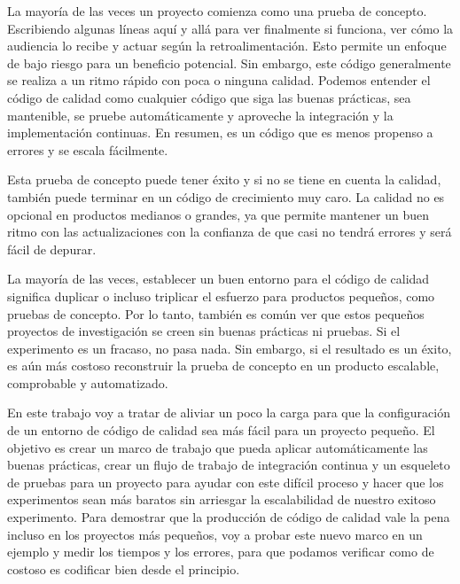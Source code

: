 La mayoría de las veces un proyecto comienza como una prueba de concepto. Escribiendo algunas líneas aquí y allá para ver finalmente si funciona, ver cómo la audiencia lo recibe y actuar según la retroalimentación. Esto permite un enfoque de bajo riesgo para un beneficio potencial. Sin embargo, este código generalmente se realiza a un ritmo rápido con poca o ninguna calidad. Podemos entender el código de calidad como cualquier código que siga las buenas prácticas, sea mantenible, se pruebe automáticamente y aproveche la integración y la implementación continuas. En resumen, es un código que es menos propenso a errores y se escala fácilmente.

Esta prueba de concepto puede tener éxito y si no se tiene en cuenta la calidad, también puede terminar en un código de crecimiento muy caro. La calidad no es opcional en productos medianos o grandes, ya que permite mantener un buen ritmo con las actualizaciones con la confianza de que casi no tendrá errores y será fácil de depurar.

La mayoría de las veces, establecer un buen entorno para el código de calidad significa duplicar o incluso triplicar el esfuerzo para productos pequeños, como pruebas de concepto. Por lo tanto, también es común ver que estos pequeños proyectos de investigación se creen sin buenas prácticas ni pruebas. Si el experimento es un fracaso, no pasa nada. Sin embargo, si el resultado es un éxito, es aún más costoso reconstruir la prueba de concepto en un producto escalable, comprobable y automatizado.

En este trabajo voy a tratar de aliviar un poco la carga para que la configuración de un entorno de código de calidad sea más fácil para un proyecto pequeño. El objetivo es crear un marco de trabajo que pueda aplicar automáticamente las buenas prácticas, crear un flujo de trabajo de integración continua y un esqueleto de pruebas para un proyecto para ayudar con este difícil proceso y hacer que los experimentos sean más baratos sin arriesgar la escalabilidad de nuestro exitoso experimento. Para demostrar que la producción de código de calidad vale la pena incluso en los proyectos más pequeños, voy a probar este nuevo marco en un ejemplo y medir los tiempos y los errores, para que podamos verificar como de costoso es codificar bien desde el principio.
